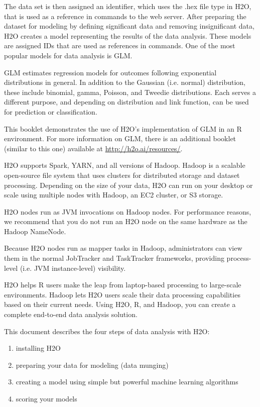The data set is then assigned an identifier, which uses the .hex file type in H2O, that is used as a reference in  commands to the web server. After preparing the dataset for modeling by defining significant data and removing insignificant data, H2O creates a model representing the results of the data analysis. These models are assigned IDs that are used as references in commands. One of the most popular models for data analysis is GLM. 

GLM estimates regression models for outcomes following exponential distributions in general. In addition to the Gaussian (i.e. normal) distribution, these include binomial, gamma, Poisson, and Tweedie distributions. Each serves a different purpose, and depending on distribution and link function, can be used for prediction or classification.

This booklet demonstrates the use of H2O's implementation of GLM in an R environment. For more information on GLM, there is an additional booklet (similar to this one) available at {\url{http://h2o.ai/resources/}}. 

H2O supports Spark, YARN, and all versions of Hadoop. Hadoop is a scalable open-source file system that uses clusters for distributed storage and dataset processing. Depending on the size of your data, H2O can run on your desktop or scale using multiple nodes with Hadoop, an EC2 cluster, or S3 storage. 

H2O nodes run as JVM invocations on Hadoop nodes. For performance reasons, we recommend that you do not run an H2O node on the same hardware as the Hadoop NameNode.

Because H2O nodes run as mapper tasks in Hadoop, administrators can view them in the normal JobTracker and TaskTracker frameworks, providing process-level (i.e. JVM instance-level) visibility.

H2O helps R users make the leap from laptop-based processing to large-scale environments. Hadoop lets H2O users scale their data processing capabilities based on their current needs. Using H2O, R, and Hadoop, you can create a complete end-to-end data analysis solution. 

This document describes the four steps of data analysis with H2O: 
\begin{enumerate}

\item installing H2O
\item preparing your data for modeling (data munging)
\item creating a model using simple but powerful machine learning algorithms
\item scoring your models

\end{enumerate}

